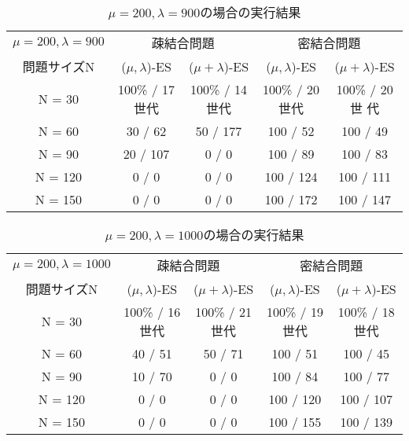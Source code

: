 \documentclass[a4j]{jarticle}
\begin{document}
\begin{table}[htb]
 \begin{center}
  \begin{tabular}[tb]{|c||c|c||c|c|} \hline
   $\mu = 200, \lambda = 900$& \multicolumn{2}{c||}{疎結合問題} &
   \multicolumn{2}{c|}{密結合問題} \\ \cline{2-5}
   問題サイズN& ($\mu, \lambda$)-ES& ($\mu + \lambda$)-ES& ($\mu, \lambda$)-ES&
   ($\mu + \lambda$)-ES \\ \hline \hline
   N = 30& 100\% / 17世代& 100\% / 14世代& 100\% / 20世代& 100\% / 20世
   代\\ \hline
   N = 60& 30 / 62&50 / 177 & 100 / 52& 100 / 49\\ \hline
   N = 90& 20 / 107&0 / 0& 100 / 89& 100 / 83\\ \hline
   N = 120& 0 / 0&0 / 0 & 100 / 124& 100 / 111\\ \hline
   N = 150& 0 / 0&0 / 0 & 100 / 172& 100 / 147\\ \hline
  \end{tabular}
  \caption{$\mu = 200, \lambda = 900$の場合の実行結果}
  \label{29}
 \end{center}
\end{table}
\begin{table}[htb]
 \begin{center}
  \begin{tabular}[tb]{|c||c|c||c|c|} \hline
   $\mu = 200, \lambda = 1000$& \multicolumn{2}{c||}{疎結合問題} &
   \multicolumn{2}{c|}{密結合問題} \\ \cline{2-5}
   問題サイズN& ($\mu, \lambda$)-ES& ($\mu + \lambda$)-ES& ($\mu, \lambda$)-ES&
   ($\mu + \lambda$)-ES \\ \hline \hline
   N = 30& 100\% / 16世代& 100\% / 21世代& 100\% / 19世代&100\% / 18世代 \\ \hline
   N = 60& 40 / 51&50 / 71 &100 / 51 &100 / 45 \\ \hline
   N = 90& 10 / 70&0 / 0 &100 / 84 & 100 / 77\\ \hline
   N = 120& 0 / 0 &0 / 0 & 100 / 120& 100 / 107\\ \hline
   N = 150& 0 / 0&0 / 0 &100 / 155 & 100 / 139\\ \hline
  \end{tabular}
  \caption{$\mu = 200, \lambda = 1000$の場合の実行結果}
  \label{210}
 \end{center}
\end{table}
\end{document}
